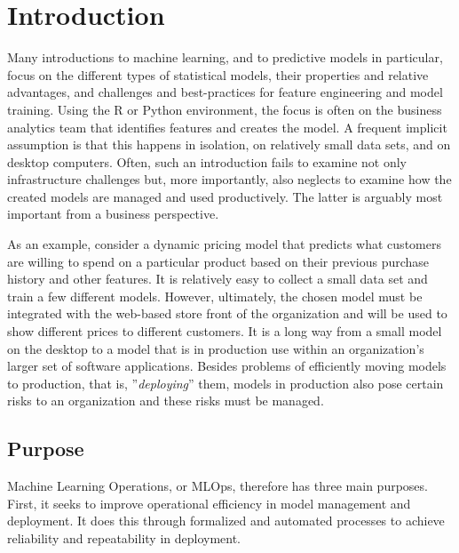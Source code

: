 \section{Introduction}

Many introductions to machine learning, and to predictive models in particular, focus on the different types of statistical models, their properties and relative advantages, and challenges and best-practices for feature engineering and model training. Using the R or Python environment, the focus is often on the business analytics team that identifies features and creates the model. A frequent implicit assumption is that this happens in isolation, on relatively small data sets, and on desktop computers. Often, such an introduction fails to examine not only infrastructure challenges but, more importantly, also neglects to examine how the created models are managed and used productively. The latter is arguably most important from a business perspective.

As an example, consider a dynamic pricing model that predicts what customers are willing to spend on a particular product based on their previous purchase history and other features. It is relatively easy to collect a small data set and train a few different models. However, ultimately, the chosen model must be integrated with the web-based store front of the organization and will be used to show different prices to different customers. It is a long way from a small model on the desktop to a model that is in production use within an organization's larger set of software applications. Besides problems of efficiently moving models to production, that is, ''\emph{deploying}'' them, models in production also pose certain risks to an organization and these risks must be managed. 

\subsection*{Purpose}

Machine Learning Operations, or MLOps, therefore has three main purposes. First, it seeks to improve operational efficiency in model management and deployment. It does this through formalized and automated processes to achieve reliability and repeatability in deployment. 

